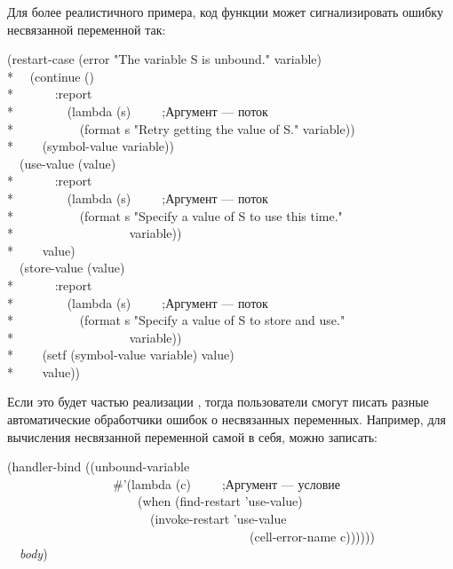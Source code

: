 Для более реалистичного примера, код функции  может
сигнализировать ошибку несвязанной переменной так:
\begin{lisp}
(restart-case (error "The variable {\Xtilde}S is unbound." variable) \\*
~~(continue () \\*
~~~~~~:report \\*
~~~~~~~~(lambda (s)~~~~~;\textrm{Аргумент  --- поток} \\*
~~~~~~~~~~(format s "Retry getting the value of {\Xtilde}S." variable)) \\*
~~~~(symbol-value variable)) \\
~~(use-value (value) \\*
~~~~~~:report \\*
~~~~~~~~(lambda (s)~~~~~;\textrm{Аргумент  --- поток} \\*
~~~~~~~~~~(format s "Specify a value of {\Xtilde}S to use this time." \\*
~~~~~~~~~~~~~~~~~~variable)) \\*
~~~~value) \\
~~(store-value (value) \\*
~~~~~~:report \\*
~~~~~~~~(lambda (s)~~~~~;\textrm{Аргумент  --- поток} \\*
~~~~~~~~~~(format s "Specify a value of {\Xtilde}S to store and use." \\*
~~~~~~~~~~~~~~~~~~variable)) \\*
~~~~(setf (symbol-value variable) value) \\*
~~~~value))
\end{lisp}
Если это будет частью реализации , тогда пользователи смогут
писать разные автоматические обработчики ошибок о несвязанных
переменных. Например, для вычисления несвязанной переменной самой в себя, можно
записать:
\begin{lisp}
(handler-bind ((unbound-variable \\
~~~~~~~~~~~~~~~~~\#'(lambda (c)~~~~~;\textrm{Аргумент  --- условие} \\
~~~~~~~~~~~~~~~~~~~~~(when (find-restart 'use-value) \\
~~~~~~~~~~~~~~~~~~~~~~~(invoke-restart 'use-value \\
~~~~~~~~~~~~~~~~~~~~~~~~~~~~~~~~~~~~~~~(cell-error-name c)))))) \\
~~\emph{body})
\end{lisp}

